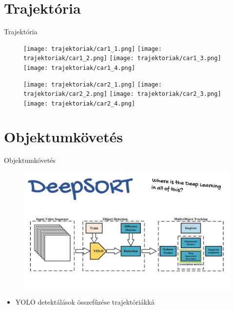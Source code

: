 \documentclass{beamer}
\begin{document}
\section{Trajektória}
\begin{frame}{Trajektória}
   \begin{figure}
        \texttt{[image: trajektoriak/car1\_1.png]}
        \texttt{[image: trajektoriak/car1\_2.png]}
        \texttt{[image: trajektoriak/car1\_3.png]}
        \texttt{[image: trajektoriak/car1\_4.png]}
   \end{figure} 
   \begin{figure}
        \texttt{[image: trajektoriak/car2\_1.png]}
        \texttt{[image: trajektoriak/car2\_2.png]}
        \texttt{[image: trajektoriak/car2\_3.png]}
        \texttt{[image: trajektoriak/car2\_4.png]}
   \end{figure} 
\end{frame}

\section{Objektumkövetés}
\begin{frame}{Objektumkövetés}
    \centering
    \begin{figure}
        \includegraphics[scale=0.2]{deepsort_flowchart.jpg} 
    \end{figure}
    \begin{itemize}
        \item YOLO detektálások összefűzése trajektóriákká
    \end{itemize}
\end{frame}
\end{document}
